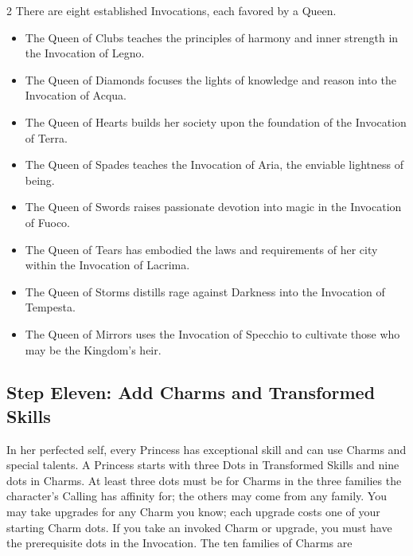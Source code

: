\begin{multicols}{2}
There are eight established Invocations, each favored by a Queen.

\begin{itemize}
\item The Queen of Clubs teaches the principles of harmony and inner strength in the Invocation of Legno.
\item The Queen of Diamonds focuses the lights of knowledge and reason into the Invocation of Acqua.
\item The Queen of Hearts builds her society upon the foundation of the Invocation of Terra.
\item The Queen of Spades teaches the Invocation of Aria, the enviable lightness of being.
\item The Queen of Swords raises passionate devotion into magic in the Invocation of Fuoco.
\item The Queen of Tears has embodied the laws and requirements of her city within the Invocation of Lacrima.
\item The Queen of Storms distills rage against Darkness into the Invocation of Tempesta.
\item The Queen of Mirrors uses the Invocation of Specchio to cultivate those who may be the Kingdom’s heir.
\end{itemize}

\subsection*{Step Eleven: Add Charms and Transformed Skills}

In her perfected self, every Princess has exceptional skill and can use Charms and special talents. A Princess starts with three Dots in Transformed Skills and nine dots in Charms. At least three dots must be for Charms in the three families the character's Calling has affinity for; the others may come from any family. You may take upgrades for any Charm you know; each upgrade costs one of your starting Charm dots. If you take an invoked Charm or upgrade, you must have the prerequisite dots in the Invocation. The ten families of Charms are


\end{multicols}
